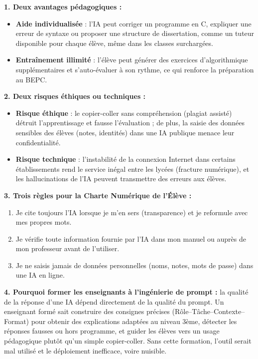 \documentclass[11pt]{article}
\begin{document}
\begin{corrige}
\textbf{1. Deux avantages pédagogiques :}
\begin{itemize}
    \item \textbf{Aide individualisée} : l'IA peut corriger un programme en C, expliquer une erreur de syntaxe ou proposer une structure de dissertation, comme un tuteur disponible pour chaque élève, même dans les classes surchargées.
    \item \textbf{Entraînement illimité} : l'élève peut générer des exercices d'algorithmique supplémentaires et s'auto-évaluer à son rythme, ce qui renforce la préparation au BEPC.
\end{itemize}

\textbf{2. Deux risques éthiques ou techniques :}
\begin{itemize}
    \item \textbf{Risque éthique} : le copier-coller sans compréhension (plagiat assisté) détruit l'apprentissage et fausse l'évaluation ; de plus, la saisie des données sensibles des élèves (notes, identités) dans une IA publique menace leur confidentialité.
    \item \textbf{Risque technique} : l'instabilité de la connexion Internet dans certains établissements rend le service inégal entre les lycées (fracture numérique), et les hallucinations de l'IA peuvent transmettre des erreurs aux élèves.
\end{itemize}

\textbf{3. Trois règles pour la Charte Numérique de l'Élève :}
\begin{enumerate}
    \item Je cite toujours l'IA lorsque je m'en sers (transparence) et je reformule avec mes propres mots.
    \item Je vérifie toute information fournie par l'IA dans mon manuel ou auprès de mon professeur avant de l'utiliser.
    \item Je ne saisis jamais de données personnelles (noms, notes, mots de passe) dans une IA en ligne.
\end{enumerate}

\textbf{4. Pourquoi former les enseignants à l'ingénierie de prompt :} la qualité de la réponse d'une IA dépend directement de la qualité du prompt. Un enseignant formé sait construire des consignes précises (Rôle--Tâche--Contexte--Format) pour obtenir des explications adaptées au niveau 3ème, détecter les réponses fausses ou hors programme, et guider les élèves vers un usage pédagogique plutôt qu'un simple copier-coller. Sans cette formation, l'outil serait mal utilisé et le déploiement inefficace, voire nuisible.


\end{corrige}
\end{document}
